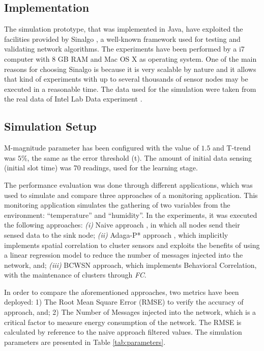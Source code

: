 \documentclass{acm_proc_article-sp}
\begin{document}
\subsection{Implementation}
\label{implementation}

The simulation prototype, that was implemented in Java, have exploited the
facilities provided by Sinalgo \cite{Sinalgo2007}, a well-known framework used
for testing and validating network algorithms. The experiments have been
performed by a i7 computer with 8 GB RAM and Mac OS X as operating system.
One of the main reasons for choosing Sinalgo is because it is very scalable by
nature and it allows that kind of experiments with up to several thousands of
sensor nodes may be executed in a reasonable time. The data used for the
simulation were taken from the real data of Intel Lab Data experiment
\cite{Intel2004}.

\subsection{Simulation Setup}
\label{data-and-experiments}

M-magnitude parameter has been configured with the value of $1.5$ and T-trend
was $5\%$, the same as the error threshold (t). The amount of initial data sensing
(initial slot time) was 70 readings, used for the learning stage.
\vspace*{-.3cm}

The performance evaluation was done through different applications, which was used
to simulate and compare three approaches of a monitoring application. 
This monitoring application simulates the gathering of two variables from the
environment: ``temperature'' and ``humidity''.
In the experiments, it was executed the following approaches: {\it
  (i)} Naive approach \cite{Madden2005}, in which all nodes send their sensed
data to the sink node;  {\it
  (ii)} Adaga-P* approach \cite{MaiaACR2013}, which
implicitly implements spatial correlation to cluster sensors and exploits the
benefits of using a linear regression model to reduce the number of messages
injected into the network, and;  {\it 
  (iii)} BCWSN approach, which implements Behavioral Correlation, with the
  maintenance of clusters through \textit{FC}.
\vspace*{-.3cm}

In order to compare the aforementioned approaches, two metrics have been
deployed: 1) The Root Mean Square Error (RMSE) to verify the accuracy of
approach, and; 2) The Number of Messages injected into the network, which is a
critical factor to measure energy consumption of the network. The RMSE is
calculated by reference to the naive approach filtered values.
The simulation parameters are presented in Table \ref{tab:parameters}.
\end{document}
